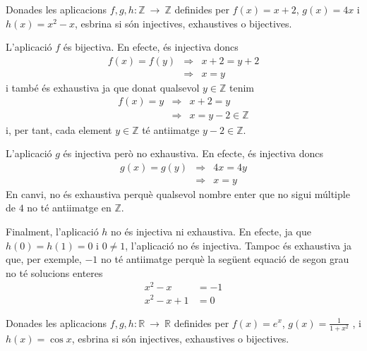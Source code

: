 \begin{exercici}
Donades les aplicacions $f,g,h:\mathbb{Z}~\longrightarrow ~\mathbb{Z}$
definides per $f(x)=x+2$, $g(x)=4x$ i $h(x)=x^{2}-x$, esbrina si són
injectives, exhaustives o bijectives.
\end{exercici}

\begin{solucio}
L'aplicació $f$ és bijectiva. En efecte, és injectiva doncs%
\begin{equation*}
\begin{array}{lll}
f(x)=f(y) & \Longrightarrow & x+2=y+2 \\
& \Longrightarrow & x=y%
\end{array}%
\end{equation*}%
i també és exhaustiva ja que donat qualsevol $y\in \mathbb{Z}$ tenim%
\begin{equation*}
\begin{array}{lll}
f(x)=y & \Longrightarrow & x+2=y \\
& \Longrightarrow & x=y-2\in \mathbb{Z}%
\end{array}%
\end{equation*}%
i, per tant, cada element $y\in \mathbb{Z}$ té antiimatge $y-2\in
\mathbb{Z}$.

L'aplicació $g$ és injectiva però no exhaustiva. En efecte, és injectiva doncs%
\begin{equation*}
\begin{array}{lll}
g(x)=g(y) & \Longrightarrow & 4x=4y \\
& \Longrightarrow & x=y%
\end{array}%
\end{equation*}%
En canvi, no és exhaustiva perquè qualsevol nombre enter que no
sigui múltiple de $4$ no té antiimatge en $\mathbb{Z}$.

Finalment, l'aplicació $h$ no és injectiva ni exhaustiva. En efecte,
ja que $h(0)=h(1)=0$ i $0\neq 1$, l'aplicació no és injectiva.
Tampoc és exhaustiva ja que, per exemple, $-1$ no té antiimatge perquè
la següent equació de segon grau no té solucions enteres
\begin{align*}
x^{2}-x& =-1 \\
x^{2}-x+1& =0
\end{align*}
\end{solucio}

\begin{exercici}
Donades les aplicacions $f,g,h:\mathbb{R}~\longrightarrow ~\mathbb{R}$
definides per $f(x)=e^{x}$, $g(x)=\frac{1}{1+x^{2}}$ , i $h(x)=\cos x$,
esbrina si són injectives, exhaustives o bijectives.
\end{exercici}

